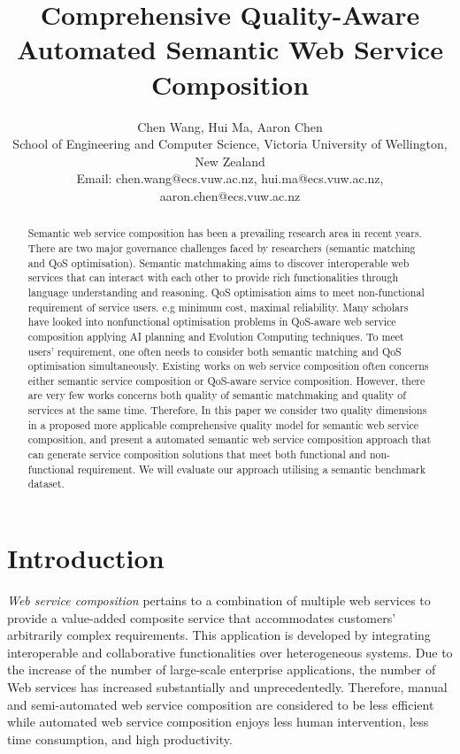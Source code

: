 \documentclass{IEEEtran}
\title{Comprehensive Quality-Aware Automated Semantic Web Service Composition}
\author{Chen Wang, Hui Ma, Aaron Chen\\ School of
 Engineering and Computer Science, Victoria University of Wellington, New Zealand\\
Email: chen.wang@ecs.vuw.ac.nz, hui.ma@ecs.vuw.ac.nz, aaron.chen@ecs.vuw.ac.nz}
\begin{document}
\maketitle
\begin{abstract}
Semantic web service composition has been a prevailing research area in recent years. There are two major governance challenges faced by researchers (semantic matching and QoS optimisation). Semantic matchmaking aims to discover interoperable web services that can interact with each other to provide rich functionalities through language understanding and reasoning. QoS optimisation aims to meet non-functional requirement of service users. e.g minimum cost, maximal reliability. Many scholars have looked into nonfunctional optimisation problems in QoS-aware web service composition applying AI planning and Evolution Computing techniques. To meet users' requirement, one often needs to consider both semantic matching and QoS optimisation simultaneously. Existing works on web service composition often concerns either semantic service composition or QoS-aware service composition. However, there are very few works concerns both quality of semantic matchmaking and quality of services at the same time. Therefore, In this paper we consider two quality dimensions in a proposed more applicable comprehensive quality model for semantic web service composition, and present a automated semantic web service composition approach that can generate service composition solutions that meet both functional and non-functional requirement. We will evaluate our approach utilising a semantic benchmark dataset.

\end{abstract}
\vspace{-0.8cm}
\section{Introduction}\label{introduction}

\textit{Web service composition} pertains to a combination of multiple web services to provide a value-added composite service that accommodates customers' arbitrarily complex requirements. This application is developed by integrating interoperable and collaborative functionalities over heterogeneous systems. Due to the increase of the number of large-scale enterprise applications, the number of Web services has increased substantially and unprecedentedly. Therefore, manual and semi-automated web service composition are considered to be less efficient while automated web service composition enjoys less human intervention, less time consumption, and high productivity.
\end{document}
